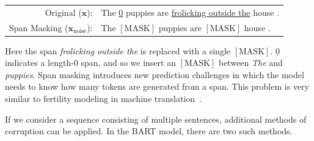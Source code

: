 \begin{itemize}
    \begin{center}
    \begingroup
    \renewcommand{\arraystretch}{1.2}
    \begin{tabular}{r l}
    Original ($\mathbf{x}$): & The \underline{0} puppies are \underline{frolicking outside the} house . \\
    Span Masking ($\mathbf{x}_{\mathrm{noise}}$): & The $\mathrm{[MASK]}$ puppies are $\mathrm{[MASK]}$ house .
    \end{tabular}
    \endgroup
    \end{center}

    \noindent Here the span \textit{frolicking outside the} is replaced with a single $\mathrm{[MASK]}$. $\underline{0}$ indicates a length-0 span, and so we insert an $\mathrm{[MASK]}$ between \textit{The} and \textit{puppies}. Span masking introduces new prediction challenges in which the model needs to know how many tokens are generated from a span. This problem is very similar to fertility modeling in machine translation~\cite{brown-etal:1993mathematics}.
\end{itemize}
\vspace{0.5em}

If we consider a sequence consisting of multiple sentences, additional methods of corruption can be applied. In the BART model, there are two such methods.

